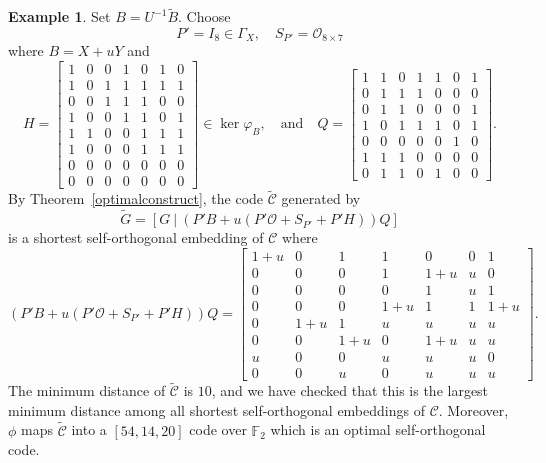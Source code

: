 \documentclass{article}
\theoremstyle{definition}
\newtheorem{example}{Example}[section]
\theoremstyle{remark}
\begin{document}
\begin{example}
    Set $B=U^{-1}\tilde{B}$. Choose
    \[
    P'=I_8\in \Gamma_X,\quad S_{P'}=\mathcal{O}_{8\times 7}
    \]
    where $B=X+uY$ and
    \[
    H=\begin{bmatrix}
    1 & 0 & 0 & 1 & 0 & 1 & 0\\
    1 & 0 & 1 & 1 & 1 & 1 & 1\\
    0 & 0 & 1 & 1 & 1 & 0 & 0\\
    1 & 0 & 0 & 1 & 1 & 0 & 1\\
    1 & 1 & 0 & 0 & 1 & 1 & 1\\
    1 & 0 & 0 & 0 & 1 & 1 & 1\\
    0 & 0 & 0 & 0 & 0 & 0 & 0\\
    0 & 0 & 0 & 0 & 0 & 0 & 0
    \end{bmatrix}\in \ker\varphi_{B},\quad\mbox{and}\quad
    Q=\begin{bmatrix}
    1 & 1 & 0 & 1 & 1 & 0 & 1\\
    0 & 1 & 1 & 1 & 0 & 0 & 0\\
    0 & 1 & 1 & 0 & 0 & 0 & 1\\
    1 & 0 & 1 & 1 & 1 & 0 & 1\\
    0 & 0 & 0 & 0 & 0 & 1 & 0\\
    1 & 1 & 1 & 0 & 0 & 0 & 0\\
    0 & 1 & 1 & 0 & 1 & 0 & 0
    \end{bmatrix}.
    \]
    By Theorem~\ref{optimalconstruct}, the code $\tilde{\mathcal{C}}$ generated by
    \[
    \tilde{G}=[G~|~(P'B+u(P'\mathcal{O}+S_{P'}+P'H))Q]
    \]
    is a shortest self-orthogonal embedding of $\mathcal{C}$
    where
    \[
    (P'B+u(P'\mathcal{O}+S_{P'}+P'H))Q=
    \begin{bmatrix}
    1+u & 0 & 1 & 1 & 0 & 0 & 1\\
    0 & 0 & 0 & 1 & 1+u & u & 0\\
    0 & 0 & 0 & 0 & 1 & u & 1\\
    0 & 0 & 0 & 1+u & 1 & 1 & 1+u\\
    0 & 1+u & 1 & u & u & u & u\\
    0 & 0 & 1+u & 0 & 1+u & u & u\\
    u & 0 & 0 & u & u & u & 0\\
    0 & 0 & u & 0 & u & u & u
    \end{bmatrix}.
    \]
    The minimum distance of $\tilde{\mathcal{C}}$ is $10$, and we have checked that this is the largest minimum distance among all shortest self-orthogonal embeddings of $\mathcal{C}$. Moreover, $\phi$ maps $\tilde{\mathcal{C}}$ into a $[54, 14, 20]$ code over $\mathbb{F}_2$ which is an optimal self-orthogonal code.
\end{example}
\end{document}
